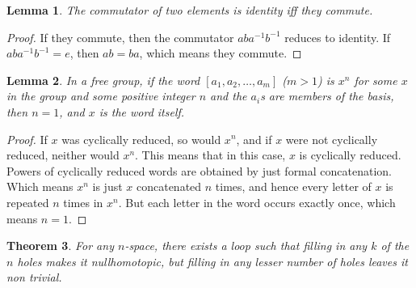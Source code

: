 \documentclass[12pt]{article}
\newtheorem{thm}{Theorem}[section]
\newtheorem{lem}[thm]{Lemma}
\theoremstyle{definition}
\begin{document}
\begin{lem}
The commutator of two elements is identity iff they commute.
\end{lem}

\begin{proof}
If they commute, then the commutator $aba^{-1}b^{-1}$ reduces to identity. If $aba^{-1}b^{-1}=e$, then $ab=ba$, which means they commute. 
\end{proof}

\begin{lem}\label{impo2}
In a free group, if the word $[a_1, a_2, \ldots, a_m]$ ($m>1$) is $x^n$ for some $x$ in the group and some positive integer $n$ and the $a_i$s are members of the basis, then $n=1$, and $x$ is the word itself.
\end{lem}

\begin{proof}
If $x$ was cyclically reduced, so would $x^n$, and if $x$ were not cyclically reduced, neither would $x^n$. This means that in this case, $x$ is cyclically reduced. Powers of cyclically reduced words are obtained by just formal concatenation. Which means $x^n$ is just $x$ concatenated $n$ times, and hence every letter of $x$ is repeated $n$ times in $x^n$. But each letter in the word occurs exactly once, which means $n=1$.
\end{proof}

\begin{thm}
For any $n$-space, there exists a loop such that filling in any $k$ of the $n$ holes makes it nullhomotopic, but filling in any lesser number of holes leaves it non trivial.
\end{thm}
\end{document}
